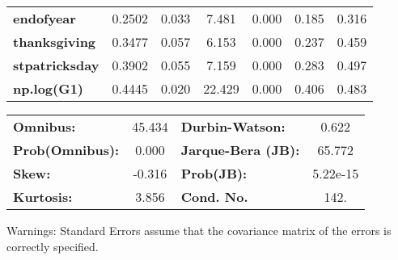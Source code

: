 \begin{center}
\begin{tabular}{lcccccc}
\textbf{endofyear}                         &       0.2502  &        0.033     &     7.481  &         0.000        &        0.185    &        0.316     \\
\textbf{thanksgiving}                      &       0.3477  &        0.057     &     6.153  &         0.000        &        0.237    &        0.459     \\
\textbf{stpatricksday}                     &       0.3902  &        0.055     &     7.159  &         0.000        &        0.283    &        0.497     \\
\textbf{np.log(G1)}                        &       0.4445  &        0.020     &    22.429  &         0.000        &        0.406    &        0.483     \\
\bottomrule
\end{tabular}
\begin{tabular}{lclc}
\textbf{Omnibus:}       & 45.434 & \textbf{  Durbin-Watson:     } &    0.622  \\
\textbf{Prob(Omnibus):} &  0.000 & \textbf{  Jarque-Bera (JB):  } &   65.772  \\
\textbf{Skew:}          & -0.316 & \textbf{  Prob(JB):          } & 5.22e-15  \\
\textbf{Kurtosis:}      &  3.856 & \textbf{  Cond. No.          } &     142.  \\
\bottomrule
\end{tabular}
\end{center}

Warnings: \newline
 [1] Standard Errors assume that the covariance matrix of the errors is correctly specified.